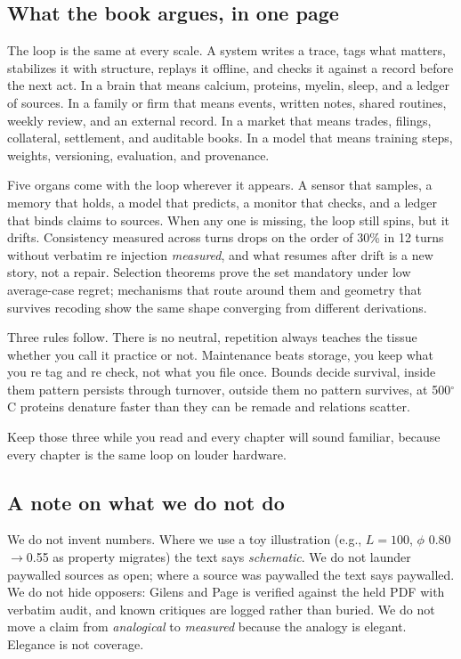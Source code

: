\subsection*{What the book argues, in one page}

The loop is the same at every scale. A system writes a trace, tags what matters, stabilizes it with structure, replays it offline, and checks it against a record before the next act. In a brain that means calcium, proteins, myelin, sleep, and a ledger of sources. In a family or firm that means events, written notes, shared routines, weekly review, and an external record. In a market that means trades, filings, collateral, settlement, and auditable books. In a model that means training steps, weights, versioning, evaluation, and provenance.

Five organs come with the loop wherever it appears. A sensor that samples, a memory that holds, a model that predicts, a monitor that checks, and a ledger that binds claims to sources. When any one is missing, the loop still spins, but it drifts. Consistency measured across turns drops on the order of 30\% in 12 turns without verbatim re injection \textit{measured}, and what resumes after drift is a new story, not a repair. Selection theorems \citep{nayebi2026} prove the set mandatory under low average-case regret; mechanisms that route around them \citep{macar2026,cao2026} and geometry that survives recoding \citep{jha2025} show the same shape converging from different derivations.

Three rules follow. There is no neutral, repetition always teaches the tissue whether you call it practice or not. Maintenance beats storage, you keep what you re tag and re check, not what you file once. Bounds decide survival, inside them pattern persists through turnover, outside them no pattern survives, at 500$^\circ$C proteins denature faster than they can be remade and relations scatter.

Keep those three while you read and every chapter will sound familiar, because every chapter is the same loop on louder hardware.

\subsection*{A note on what we do not do}

We do not invent numbers. Where we use a toy illustration (e.g., $L=100$, $\phi$ 0.80$\to$0.55 as property migrates) the text says \textit{schematic}. We do not launder paywalled sources as open; where a source was paywalled the text says paywalled. We do not hide opposers: Gilens and Page \citep{gilens2014} is verified against the held PDF with verbatim audit, and known critiques are logged rather than buried. We do not move a claim from \textit{analogical} to \textit{measured} because the analogy is elegant. Elegance is not coverage.

